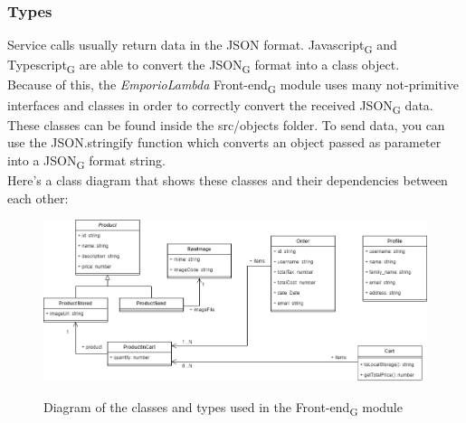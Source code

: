 \subsubsection{Types}
Service calls usually return data in the JSON format. Javascript\textsubscript{G} and Typescript\textsubscript{G} are able to convert the JSON\textsubscript{G} format into a class object.\\
Because of this, the \textit{EmporioLambda} Front-end\textsubscript{G} module uses many not-primitive interfaces and classes in order to correctly convert the received JSON\textsubscript{G} data. These classes can be found inside the src/objects folder. To send data, you can use the JSON.stringify function which converts an object passed as parameter into a JSON\textsubscript{G} format string.\\Here's a class diagram that shows these classes and their dependencies between each other:
\vspace{0.5cm}
\begin{figure}[H]
\centering
\includegraphics[scale=0.45]{res/Architettura/Frontend/img/class_frontend_types}\\
\caption{Diagram of the classes and types used in the Front-end\textsubscript{G} module}
\end{figure}